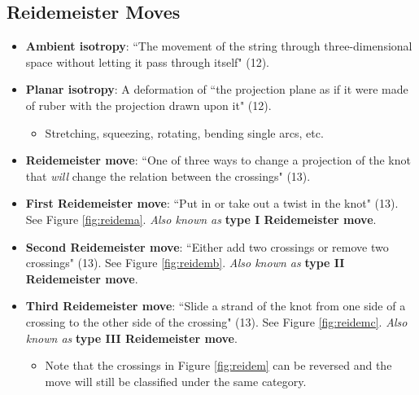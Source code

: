 \documentclass[titlepage]{article}
\numberwithin{figure}{section}
\numberwithin{table}{section}
\numberwithin{equation}{section}
\newcommand{\dq}[2]{``#1" (#2).}
\begin{document}
\subsection{Reidemeister Moves}\label{sss:Reidemeister}
\begin{itemize}
    \item \textbf{Ambient isotropy}: \dq{The movement of the string through three-dimensional space without letting it pass through itself}{12}
    \item \textbf{Planar isotropy}: A deformation of \dq{the projection plane as if it were made of ruber with the projection drawn upon it}{12}
    \begin{itemize}
        \item Stretching, squeezing, rotating, bending single arcs, etc.
    \end{itemize}
    \item \textbf{Reidemeister move}: \dq{One of three ways to change a projection of the knot that \emph{will} change the relation between the crossings}{13}
    \item \textbf{First Reidemeister move}: \dq{Put in or take out a twist in the knot}{13} See Figure \ref{fig:reidema}. \emph{Also known as} \textbf{type I Reidemeister move}.
    \item \textbf{Second Reidemeister move}: \dq{Either add two crossings or remove two crossings}{13} See Figure \ref{fig:reidemb}. \emph{Also known as} \textbf{type II Reidemeister move}.
    \item \textbf{Third Reidemeister move}: \dq{Slide a strand of the knot from one side of a crossing to the other side of the crossing}{13} See Figure \ref{fig:reidemc}. \emph{Also known as} \textbf{type III Reidemeister move}.
    \begin{itemize}
        \item Note that the crossings in Figure \ref{fig:reidem} can be reversed and the move will still be classified under the same category.
    \end{itemize}
    \begin{figure}[h!]
        \centering
        \begin{subfigure}[b]{0.3\linewidth}
            \centering
\end{subfigure}
\end{figure}
\end{itemize}
\end{document}
